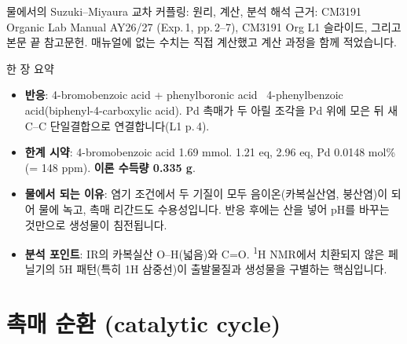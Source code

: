 \documentclass[10pt,a4paper]{article}
\begin{document}
{물에서의 Suzuki--Miyaura 교차 커플링: 원리, 계산, 분석 해석}
{근거: CM3191 Organic Lab Manual AY26/27 (Exp.\,1, pp.\,2--7), CM3191 Org L1 슬라이드, 그리고 본문 끝 참고문헌. 매뉴얼에 없는 수치는 직접 계산했고 계산 과정을 함께 적었습니다.}

\begin{callout}{한 장 요약}
\begin{itemize}[leftmargin=4mm,itemsep=0.5mm,topsep=0.5mm]
\item \textbf{반응}: 4-bromobenzoic acid + phenylboronic acid \textrightarrow\ 4-phenylbenzoic acid(biphenyl-4-carboxylic acid). Pd 촉매가 두 아릴 조각을 Pd 위에 모은 뒤 새 C--C 단일결합으로 연결합니다(L1 p.\,4).
\item \textbf{한계 시약}: 4-bromobenzoic acid 1.69 mmol.  1.21 eq,  2.96 eq, Pd 0.0148 mol\% (= 148 ppm). \textbf{이론 수득량 0.335 g}.
\item \textbf{물에서 되는 이유}: 염기 조건에서 두 기질이 모두 음이온(카복실산염, 붕산염)이 되어 물에 녹고, 촉매 리간드도 수용성입니다. 반응 후에는 산을 넣어 pH를 바꾸는 것만으로 생성물이 침전됩니다.
\item \textbf{분석 포인트}: IR의 카복실산 O--H(넓음)와 C=O. \textsuperscript{1}H NMR에서 치환되지 않은 페닐기의 5H 패턴(특히 1H 삼중선)이 출발물질과 생성물을 구별하는 핵심입니다.
\end{itemize}
\end{callout}

\section{촉매 순환 (catalytic cycle)}
\end{document}
